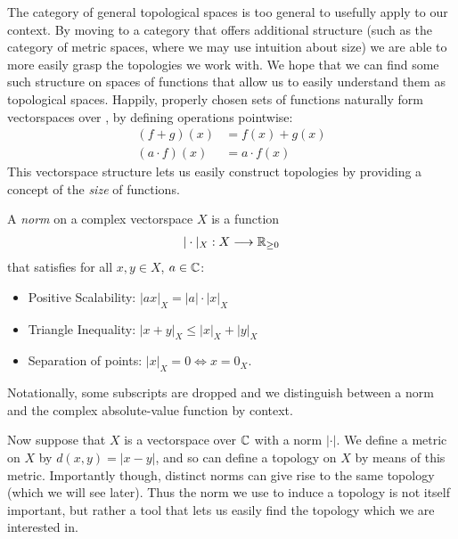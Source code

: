      The category of general topological spaces is too general to usefully apply to our context.
      By moving to a category that offers additional structure (such as the category of metric spaces, where we may use intuition about size) we are able to more easily grasp the topologies we work with.
      We hope that we can find some such structure on spaces of functions that allow us to easily understand them as topological spaces.
      Happily, properly chosen sets of functions naturally form vectorspaces over \C, by defining operations pointwise:
      \begin{align*}
        (f+g)(x) &= f(x)+g(x)\\
        (a\cdot f)(x) &= a\cdot f(x)
      \end{align*}
      This vectorspace structure lets us easily construct topologies by providing a concept of the \emph{size} of functions.
      \begin{defn}
        A \emph{norm} on a complex vectorspace $X$ is a function
        \begin{align*}
          |\cdot|_X:X\longrightarrow\mathbb{R}_{\ge0}
        \end{align*}
        that satisfies for all $x,y\in X$, $a\in\mathbb{C}$:
        \begin{itemize}
          \item Positive Scalability: $|ax|_X=|a|\cdot|x|_X$
          \item Triangle Inequality: $|x+y|_X\le|x|_X+|y|_X$
          \item Separation of points: $|x|_X=0\Longleftrightarrow x=0_X$.
        \end{itemize}
        Notationally, some subscripts are dropped and we distinguish between a norm and the complex absolute-value function by context.
      \end{defn}

      Now suppose that $X$ is a vectorspace over $\mathbb{C}$ with a norm $|\cdot|$.
      We define a metric on $X$ by $d(x,y)=|x-y|$, and so can define a topology on $X$ by means of this metric.
      Importantly though, distinct norms can give rise to the same topology (which we will see later).
      Thus the norm we use to induce a topology is not itself important, but rather a tool that lets us easily find the topology which we are interested in.

